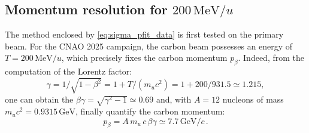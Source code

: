 \subsection{Momentum resolution for $200\,\mathrm{MeV}/u$ \texorpdfstring{}{${}^{12}$C}}\label{ssec:primary_carbon}
The method enclosed by \autoref{eq:sigma_pfit_data} is first tested on the primary  beam. For the CNAO 2025 campaign, the carbon beam possesses an energy of $T=200\,\mathrm{MeV}/u$, which precisely fixes the carbon momentum $p_\beta$. Indeed, from the computation of the Lorentz factor:
\begin{equation}
	\gamma=1/\sqrt{1-\beta^2}=1+T/(m_u c^2)=1+200/931.5\simeq1.215,
	\label{eq:lorentz_factor}
\end{equation}
one can obtain the $\beta\gamma=\sqrt{\gamma^2-1}\simeq0.69$ and, with $A=12$ nucleons of mass $m_u c^2=0.9315\,\mathrm{GeV}$, finally quantify the carbon momentum:
\begin{equation}
	p_\beta=A\,m_u\,c\,\beta\gamma\simeq7.7\,\mathrm{GeV}/c\,.
	\label{eq:carbon_momentum}
\end{equation}

